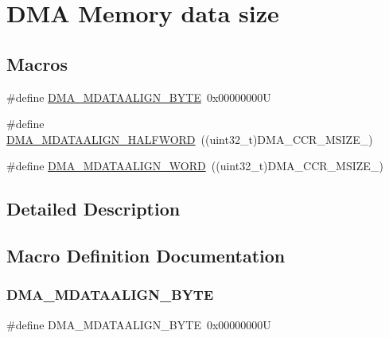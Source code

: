 \hypertarget{group___d_m_a___memory__data__size}{}\section{D\+MA Memory data size}
\label{group___d_m_a___memory__data__size}
\subsection*{Macros}
\begin{DoxyCompactItemize}
\item 
\#define \hyperlink{group___d_m_a___memory__data__size_ga9ed07bddf736298eba11508382ea4d51}{D\+M\+A\+\_\+\+M\+D\+A\+T\+A\+A\+L\+I\+G\+N\+\_\+\+B\+Y\+TE}~0x00000000U
\item 
\#define \hyperlink{group___d_m_a___memory__data__size_ga2c7355971c0da34a7ffe50ec87403071}{D\+M\+A\+\_\+\+M\+D\+A\+T\+A\+A\+L\+I\+G\+N\+\_\+\+H\+A\+L\+F\+W\+O\+RD}~((uint32\+\_\+t)D\+M\+A\+\_\+\+C\+C\+R\+\_\+\+M\+S\+I\+Z\+E\+\_)
\item 
\#define \hyperlink{group___d_m_a___memory__data__size_ga8812da819f18c873249074f3920220b2}{D\+M\+A\+\_\+\+M\+D\+A\+T\+A\+A\+L\+I\+G\+N\+\_\+\+W\+O\+RD}~((uint32\+\_\+t)D\+M\+A\+\_\+\+C\+C\+R\+\_\+\+M\+S\+I\+Z\+E\+\_)
\end{DoxyCompactItemize}


\subsection{Detailed Description}


\subsection{Macro Definition Documentation}
\mbox{\label{group___d_m_a___memory__data__size_ga9ed07bddf736298eba11508382ea4d51}} 
\subsubsection{\texorpdfstring{D\+M\+A\+\_\+\+M\+D\+A\+T\+A\+A\+L\+I\+G\+N\+\_\+\+B\+Y\+TE}{DMA\_MDATAALIGN\_BYTE}}
{\footnotesize\ttfamily \#define D\+M\+A\+\_\+\+M\+D\+A\+T\+A\+A\+L\+I\+G\+N\+\_\+\+B\+Y\+TE~0x00000000U}

